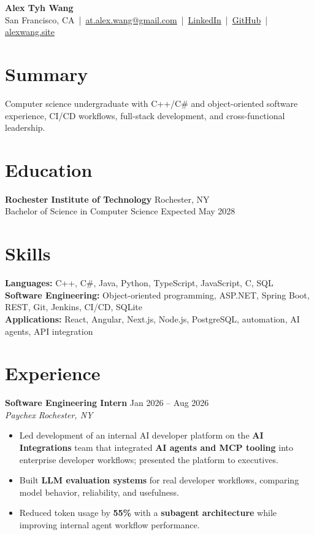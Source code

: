 \documentclass[10pt,letterpaper]{article}
\newif\ifresumeFirstRole
\newcommand{\resumeRole}[4]{%
  \ifresumeFirstRole
    \global\resumeFirstRolefalse
  \else
    \vspace{0pt plus 1fill}%
  \fi
  \textbf{#1} \hfill #2\\
  \textit{#3} \hfill \textit{#4}
}
\begin{document}
\begin{center}
{\Large \textbf{Alex Tyh Wang}}\\
San Francisco, CA \,|\, \href{mailto:at.alex.wang@gmail.com}{at.alex.wang@gmail.com} \,|\, \href{https://www.linkedin.com/in/alex-tyh-wang/}{LinkedIn} \,|\, \href{https://github.com/alextyhwang}{GitHub} \,|\, \href{https://alexwang.site}{alexwang.site}
\end{center}

\section*{Summary}
Computer science undergraduate with C++/C\# and object-oriented software experience, CI/CD workflows, full-stack development, and cross-functional leadership.

\section*{Education}
\textbf{Rochester Institute of Technology} \hfill Rochester, NY\\
Bachelor of Science in Computer Science \hfill Expected May 2028

\section*{Skills}
\textbf{Languages:} C++, C\#, Java, Python, TypeScript, JavaScript, C, SQL\\
\textbf{Software Engineering:} Object-oriented programming, ASP.NET, Spring Boot, REST, Git, Jenkins, CI/CD, SQLite\\
\textbf{Applications:} React, Angular, Next.js, Node.js, PostgreSQL, automation, AI agents, API integration

\section*{Experience}
\resumeRole{Software Engineering Intern}{Jan 2026 -- Aug 2026}{Paychex}{Rochester, NY}
\begin{itemize}
  \item Led development of an internal AI developer platform on the \textbf{AI Integrations} team that integrated \textbf{AI agents and MCP tooling} into enterprise developer workflows; presented the platform to executives.
  \item Built \textbf{LLM evaluation systems} for real developer workflows, comparing model behavior, reliability, and usefulness.
  \item Reduced token usage by \textbf{55\%} with a \textbf{subagent architecture} while improving internal agent workflow performance.
\end{itemize}
\end{document}
